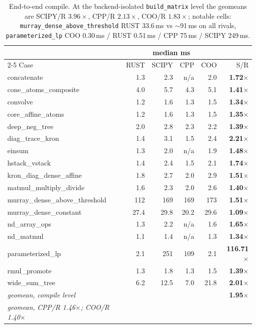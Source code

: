 \documentclass[11pt]{article}
\begin{document}
\begin{table}[h]\centering\small
\begin{tabular}{lrrrrr}
\toprule
 & \multicolumn{4}{c}{median ms} & \\
\cmidrule(lr){2-5}
Case & RUST & SCIPY & CPP & COO & S/R \\
\midrule
concatenate & 1.3 & 2.3 & n/a & 2.0 & \textbf{1.72$\times$} \\
cone\_atoms\_composite & 4.0 & 5.7 & 4.3 & 5.1 & \textbf{1.41$\times$} \\
convolve & 1.2 & 1.6 & 1.3 & 1.5 & \textbf{1.34$\times$} \\
core\_affine\_atoms & 1.2 & 1.6 & 1.3 & 1.5 & \textbf{1.35$\times$} \\
deep\_neg\_tree & 2.0 & 2.8 & 2.3 & 2.2 & \textbf{1.39$\times$} \\
diag\_trace\_kron & 1.4 & 3.1 & 1.5 & 2.4 & \textbf{2.21$\times$} \\
einsum & 1.3 & 2.0 & n/a & 1.9 & \textbf{1.48$\times$} \\
hstack\_vstack & 1.4 & 2.4 & 1.5 & 2.1 & \textbf{1.74$\times$} \\
kron\_diag\_dense\_affine & 1.8 & 2.7 & 2.0 & 2.9 & \textbf{1.51$\times$} \\
matmul\_multiply\_divide & 1.6 & 2.3 & 2.0 & 2.6 & \textbf{1.40$\times$} \\
murray\_dense\_above\_threshold & 112 & 169 & 169 & 173 & \textbf{1.51$\times$} \\
murray\_dense\_constant & 27.4 & 29.8 & 20.2 & 29.6 & \textbf{1.09$\times$} \\
nd\_array\_ops & 1.3 & 2.2 & n/a & 1.6 & \textbf{1.65$\times$} \\
nd\_matmul & 1.1 & 1.4 & n/a & 1.3 & \textbf{1.34$\times$} \\
parameterized\_lp & 2.1 & 251 & 109 & 2.1 & \textbf{116.71$\times$} \\
rmul\_promote & 1.3 & 1.8 & 1.3 & 1.5 & \textbf{1.39$\times$} \\
wide\_sum\_tree & 6.2 & 12.5 & 7.0 & 21.8 & \textbf{2.01$\times$} \\
\midrule
\textit{geomean, compile level} & & & & & \textbf{1.95$\times$} \\
\textit{geomean, CPP/R 1.46$\times$; COO/R 1.40$\times$} & & & & & \\
\bottomrule
\end{tabular}
\caption*{End-to-end compile. At the backend-isolated \texttt{build\_matrix} level the
geomeans are SCIPY/R $3.96\times$, CPP/R $2.13\times$, COO/R $1.83\times$; notable cells:
\texttt{murray\_dense\_above\_threshold} RUST 33.6\,ms vs $\sim$91\,ms on all rivals,
\texttt{parameterized\_lp} COO 0.30\,ms / RUST 0.51\,ms / CPP 75\,ms / SCIPY 249\,ms.}
\end{table}
\end{document}
